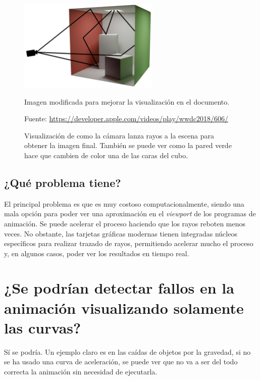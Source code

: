 \documentclass{article}
\begin{document}
\begin{figure}[H]
    \centering
    \includegraphics[width=0.6\textwidth]{imagenes/raytracingapple.jpg}
    \caption{Visualización de como la cámara lanza rayos a la escena para obtener la imagen final. También se puede ver como la pared verde hace que cambien de color una de las caras del cubo.}
   \vspace{10pt}
   \footnotesize{Imagen modificada para mejorar la visualización en el documento.}
   \vspace{10pt}

   \footnotesize{Fuente: \url{https://developer.apple.com/videos/play/wwdc2018/606/}}
 \end{figure}
\subsection{¿Qué problema tiene?}

El principal problema es que es muy costoso computacionalmente, siendo una mala opción para poder ver una aproximación en el \textit{viewport} de los programas de animación. Se puede acelerar el proceso haciendo que los rayos reboten menos veces. No obstante, las tarjetas gráficas modernas tienen integradas núcleos específicos para realizar trazado de rayos, permitiendo acelerar mucho el proceso y, en algunos casos, poder ver los resultados en tiempo real.


\section{¿Se podrían detectar fallos en la animación visualizando solamente las curvas?}

Sí se podría. Un ejemplo claro es en las caídas de objetos por la gravedad, si no se ha usado una curva de aceleración, se puede ver que no va a ser del todo correcta la animación sin necesidad de ejecutarla.
\end{document}
